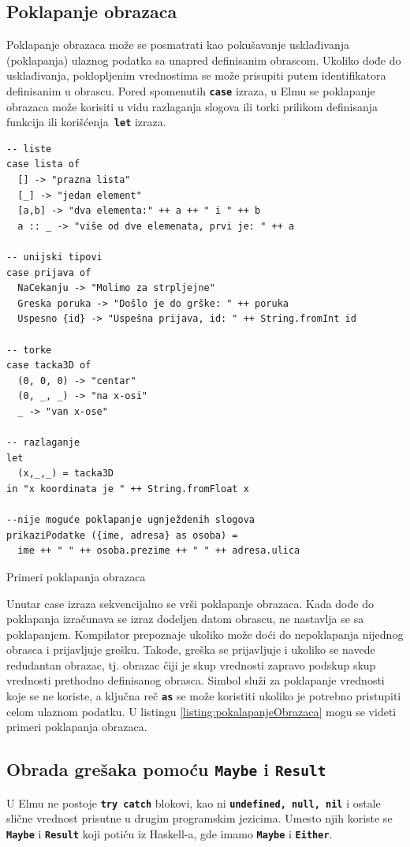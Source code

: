 \documentclass[12pt,oneside]{memoir}
\begin{document}
\subsection{Poklapanje obrazaca}
Poklapanje obrazaca može se posmatrati kao pokušavanje usklađivanja (poklapanja) ulaznog
podatka sa unapred definisanim obrascom. Ukoliko dođe do usklađivanja, poklopljenim
vrednostima se može prisupiti putem identifikatora definisanim u obrascu. Pored spomenutih
\texttt{\textbf{case}} izraza, u Elmu se poklapanje obrazaca može korisiti u vidu 
razlaganja slogova ili torki prilikom definisanja funkcija ili korišćenja\texttt{\textbf{
let}} izraza.
\begin{listing}[h]
\begin{verbatim}
-- liste 
case lista of
  [] -> "prazna lista"
  [_] -> "jedan element"
  [a,b] -> "dva elementa:" ++ a ++ " i " ++ b
  a :: _ -> "više od dve elemenata, prvi je: " ++ a

-- unijski tipovi
case prijava of
  NaCekanju -> "Molimo za strpljejne"
  Greska poruka -> "Došlo je do grške: " ++ poruka
  Uspesno {id} -> "Uspešna prijava, id: " ++ String.fromInt id

-- torke
case tacka3D of
  (0, 0, 0) -> "centar"
  (0, _, _) -> "na x-osi"
  _ -> "van x-ose"

-- razlaganje
let
  (x,_,_) = tacka3D
in "x koordinata je " ++ String.fromFloat x

--nije moguće poklapanje ugnježdenih slogova
prikaziPodatke ({ime, adresa} as osoba) =
  ime ++ " " ++ osoba.prezime ++ " " ++ adresa.ulica
\end{verbatim}
\caption{Primeri poklapanja obrazaca}
\label{listing:pokalapanjeObrazaca}
\end{listing}

Unutar case izraza sekvencijalno se vrši poklapanje obrazaca. Kada dođe do poklapanja
izračunava se izraz dodeljen datom obrascu, ne nastavlja se sa poklapanjem. Kompilator
prepoznaje ukoliko može doći do nepoklapanja nijednog obrasca i prijavljuje grešku.
Takođe, greška se prijavljuje i ukoliko se navede redudantan obrazac, tj. obrazac čiji je
skup vrednosti zapravo podskup skup vrednosti prethodno definisanog obrasca. 
Simbol \texttt{\textbf{\textunderscore}} služi za poklapanje vrednosti koje se ne koriste,
a ključna reč \texttt{\textbf{as}} se može koristiti ukoliko je potrebno pristupiti celom
ulaznom podatku. U listingu \ref{listing:pokalapanjeObrazaca} mogu se videti primeri
poklapanja obrazaca.

\subsection{Obrada grešaka pomoću \texttt{\textbf{Maybe}} i \texttt{\textbf{Result}}}
U Elmu ne postoje \texttt{\textbf{try catch}} blokovi, kao ni \texttt{\textbf{undefined, null, nil}}
i ostale slične vrednost prisutne u drugim programskim jezicima.
Umesto njih koriste se \texttt{\textbf{Maybe}} i \texttt{\textbf{Result}} koji potiču iz Haskell-a,
gde imamo \texttt{\textbf{Maybe}} i \texttt{\textbf{Either}}.
\end{document}
